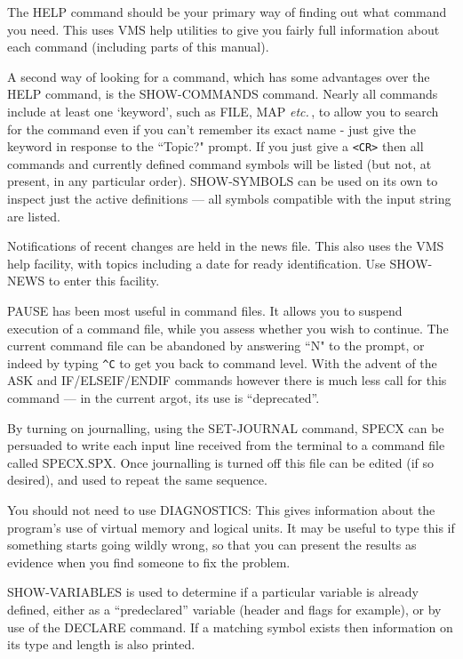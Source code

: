\documentclass[11pt,twoside]{report}
\newcommand{\etc}{{\it etc.\,}}
\begin{document}
The HELP command should be your primary way of finding out what command you
need. This uses VMS help utilities to give you fairly full information
about each command (including parts of this manual).

A second way of looking for a command, which has some advantages over the HELP
command, is the SHOW-COMMANDS command. Nearly all commands include at least
one `keyword', such as FILE, MAP \etc, to allow you to search
for the command even if you can't remember its exact name - just give the
keyword in response to the ``Topic?" prompt. If you just give a \verb+<CR>+
then all commands and currently defined command symbols will be listed (but
not, at present, in any particular order). SHOW-SYMBOLS can be used on its
own to inspect just the active definitions --- all symbols compatible with
the input string are listed.

Notifications of recent changes are held in the news file. This
also uses the VMS help facility, with topics including a date
for ready identification. Use SHOW-NEWS to enter this facility.

PAUSE has been most useful in command files. It allows you to suspend execution
of a command file, while you assess whether you wish to continue. The current
command file can be abandoned by answering ``N" to the prompt, or indeed by
typing \verb+^C+ to get you back to command level. With the advent of the ASK
and IF/ELSEIF/ENDIF commands however there is much less call for this command
--- in the current argot, its use is ``deprecated''.

By turning on journalling, using the SET-JOURNAL command,
SPECX can be persuaded to write each input line received from the terminal
to a command file called SPECX.SPX. Once journalling is turned off this file
can be edited (if so desired), and used to repeat the same sequence.

You should not need to use DIAGNOSTICS: This gives information about the
program's use of virtual memory and logical units. It may be useful to type
this if something starts going wildly wrong, so that you can present the
results as evidence when you find someone to fix the problem.

SHOW-VARIABLES is used to determine if a particular variable is already
defined, either as a ``predeclared'' variable (header and flags for example),
or by use of the DECLARE command. If a matching symbol exists then information
on its type and length is also printed.
\end{document}
